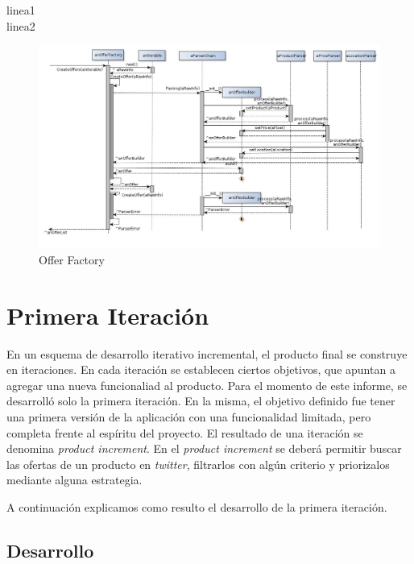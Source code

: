 \documentclass[10pt, a4paper]{article}
\begin{document}
\begin{landscape}
\newpage
linea1\\
linea2\\
\begin{figure}[H]
\centering
\includegraphics[scale=0.60]{graphics/OfferFactory_sequence.jpg}
\caption{Offer Factory}
\end{figure}

\end{landscape}

\section{Primera Iteración}

En un esquema de desarrollo iterativo incremental, el producto final se construye en iteraciones. En cada iteración se establecen ciertos objetivos, que apuntan a agregar una nueva funcionaliad al producto. Para el momento de este informe, se desarrolló solo la primera iteración. En la misma, el objetivo definido fue tener una primera versión de la aplicación con una funcionalidad limitada, pero completa frente al espíritu del proyecto. El resultado de una iteración se denomina \emph{product increment}. En el \emph{product increment} se deberá permitir buscar las ofertas de un producto en \emph{twitter}, filtrarlos con algún criterio y priorizalos mediante alguna estrategia.

A continuación explicamos como resulto el desarrollo de la primera iteración.

\subsection{Desarrollo}
\end{document}
